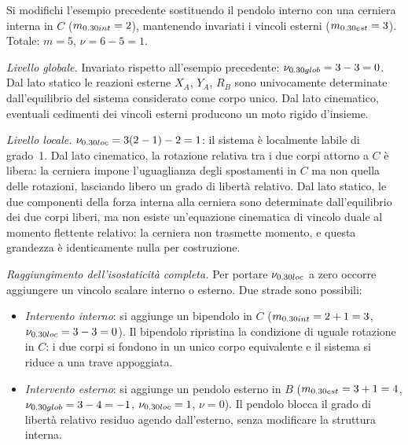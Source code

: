 \begin{esempio}
	\label{ex:glob_iso_loc_lab2}
	Si modifichi l'esempio precedente sostituendo il pendolo
	interno con una cerniera interna in $C$
	($m_{\rm int} = 2$), mantenendo invariati i vincoli
	esterni ($m_{\rm est} = 3$). Totale: $m = 5$,
	$\nu = 6 - 5 = 1$.
	
	\smallskip
	\noindent\textit{Livello globale.}
	Invariato rispetto all'esempio precedente:
	$\nu_{\rm glob} = 3 - 3 = 0$. Dal lato statico
	le reazioni esterne $X_A$, $Y_A$, $R_B$ sono
	univocamente determinate dall'equilibrio del
	sistema considerato come corpo unico. Dal lato
	cinematico, eventuali cedimenti dei vincoli
	esterni producono un moto rigido d'insieme.
	
	\smallskip
	\noindent\textit{Livello locale.}
	$\nu_{\rm loc} = 3(2-1) - 2 = 1$: il sistema è
	localmente labile di grado~1. Dal lato cinematico,
	la rotazione relativa tra i due corpi attorno a
	$C$ è libera: la cerniera impone l'uguaglianza
	degli spostamenti in $C$ ma non quella delle
	rotazioni, lasciando libero un grado di libertà
	relativo. Dal lato statico, le due componenti
	della forza interna alla cerniera sono determinate
	dall'equilibrio dei due corpi liberi, ma non esiste
	un'equazione cinematica di vincolo duale al momento
	flettente relativo: la cerniera non trasmette
	momento, e questa grandezza è identicamente nulla
	per costruzione.
	
	\smallskip
	\noindent\textit{Raggiungimento dell'isostaticità
		completa.}
	Per portare $\nu_{\rm loc}$ a zero occorre
	aggiungere un vincolo scalare interno o esterno.
	Due strade sono possibili:
	
	\begin{itemize}[nosep]
		\item \emph{Intervento interno}: si aggiunge
		un bipendolo in $C$ ($m_{\rm int} = 2 + 1 = 3$,
		$\nu_{\rm loc} = 3 - 3 = 0$). Il bipendolo
		ripristina la condizione di uguale rotazione
		in $C$: i due corpi si fondono in un unico
		corpo equivalente e il sistema si riduce a
		una trave appoggiata.
		
		\item \emph{Intervento esterno}: si aggiunge
		un pendolo esterno in $B$ ($m_{\rm est} = 3
		+ 1 = 4$, $\nu_{\rm glob} = 3 - 4 = -1$,
		$\nu_{\rm loc} = 1$, $\nu = 0$). Il pendolo
		blocca il grado di libertà relativo residuo
		agendo dall'esterno, senza modificare la
		struttura interna.
	\end{itemize}
	

\end{esempio}
